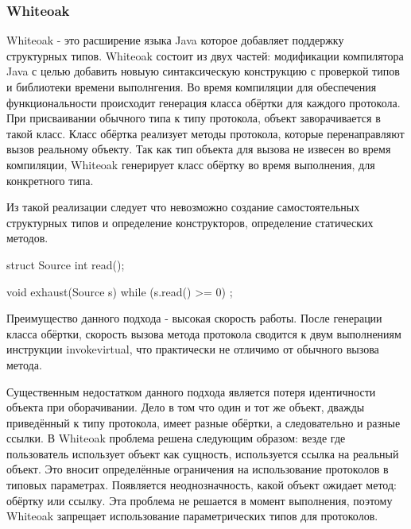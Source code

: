 \subsubsection{Whiteoak}
Whiteoak - это расширение языка Java которое добавляет поддержку структурных типов\cite{whiteoak}. Whiteoak состоит из двух частей: модификации компилятора Java с целью добавить новыую синтаксическую конструкцию с проверкой типов и библиотеки времени выполнгения. Во время компиляции для обеспечения функциональности происходит генерация класса обёртки для каждого протокола. При присваивании обычного типа к типу протокола, объект заворачивается в такой класс. Класс обёртка реализует методы протокола, которые перенаправляют вызов реальному объекту. Так как тип объекта для вызова не извесен во время компиляции, Whiteoak генерирует класс обёртку во время выполнения, для конкретного типа.

Из такой реализации следует что невозможно создание самостоятельных структурных типов и определение конструкторов, определение статических методов.

\begin{pyglist}[language=C]
struct Source { int read(); }

void exhaust(Source s) {
    while (s.read() >= 0) ;
}
\end{pyglist}

Преимущество данного подхода - высокая скорость работы. После генерации класса обёртки, скорость вызова метода протокола сводится к двум выполнениям инструкции invokevirtual, что практически не отличимо от обычного вызова метода.

Существенным недостатком данного подхода является потеря идентичности объекта при оборачивании. Дело в том что один и тот же объект, дважды приведённый к типу протокола, имеет разные обёртки, а следовательно и разные ссылки. В Whiteoak проблема решена следующим образом: везде где пользователь использует объект как сущность, используется ссылка на реальный объект. Это вносит определённые ограничения на использование протоколов в типовых параметрах. Появляется неоднозначность, какой объект ожидает метод: обёртку или ссылку. Эта проблема не решается в момент выполнения, поэтому Whiteoak запрещает использование параметрических типов для протоколов.
